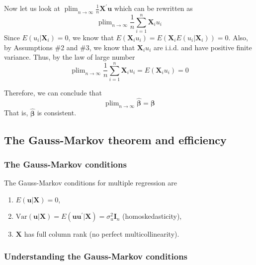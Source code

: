 \documentclass[a4paper,11pt]{article}
\newcommand{\var}{\mathrm{Var}}
\DeclareMathOperator*{\plim}{plim}
\begin{document}
Now let us look at \(\plim_{n \rightarrow \infty} \frac{1}{n}
\mathbf{X}^{\prime} \mathbf{u}\) which can be rewritten as
\[ \plim_{n \rightarrow \infty} \frac{1}{n} \sum_{i=1}^n \mathbf{X}_i
u_i \]
Since \(E(u_i | \mathbf{X}_i) = 0\), we know that \(E(\mathbf{X}_i u_i) =
E(\mathbf{X}_iE(u_i | \mathbf{X}_i)) = 0\). Also, by Assumptions \#2 and
\#3, we know that \(\mathbf{X}_i u_i\) are i.i.d. and have positive
finite variance. Thus, by the law of large number
\[ \plim_{n \rightarrow  \infty} \frac{1}{n} \sum_{i=1}^n \mathbf{X}_i u_i = E(\mathbf{X}_i
u_i) = 0 \]

Therefore, we can conclude that
\[ \plim_{n \rightarrow \infty} \hat{\boldsymbol{\beta}} = \boldsymbol{\beta}  \]
That is, \(\hat{\boldsymbol{\beta}}\) is consistent.

\subsection{The Gauss-Markov theorem and efficiency}
\label{sec:org27e9b88}
\subsubsection*{The Gauss-Markov conditions}
\label{sec:org1288fae}
The Gauss-Markov conditions for multiple regression are
\begin{enumerate}
\item \(E(\mathbf{u} | \mathbf{X}) = 0\),
\item \(\var(\mathbf{u} | \mathbf{X}) = E(\mathbf{uu}^{\prime} |
   \mathbf{X}) = \sigma^2_u \mathbf{I}_n\) (homoskedasticity),
\item \(\mathbf{X}\) has full column rank (no perfect multicollinearity).
\end{enumerate}

\subsubsection*{Understanding the Gauss-Markov conditions}
\label{sec:orgb668f2e}
\end{document}
